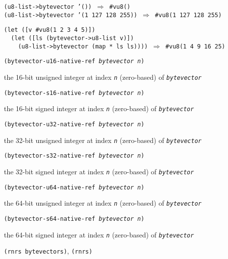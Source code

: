 \begin{alltt}
(u8-list-\textgreater{}bytevector '()) \(\Rightarrow\) \#{}vu8()
(u8-list-\textgreater{}bytevector '(1 127 128 255)) \(\Rightarrow\) \#{}vu8(1 127 128 255)

(let ([v \#{}vu8(1 2 3 4 5)])
  (let ([ls (bytevector-\textgreater{}u8-list v)])
    (u8-list-\textgreater{}bytevector (map * ls ls)))) \(\Rightarrow\) \#{}vu8(1 4 9 16 25)
\end{alltt}

\begin{description}

\label{objects_s254}\item[procedure] \texttt{(bytevector-u16-native-ref \textit{bytevector} \textit{n})}



\item[returns] the 16-bit unsigned integer at index \texttt{\textit{n}} (zero-based) of \texttt{\textit{bytevector}} 


\item[procedure] \texttt{(bytevector-s16-native-ref \textit{bytevector} \textit{n})}



\item[returns] the 16-bit signed integer at index \texttt{\textit{n}} (zero-based) of \texttt{\textit{bytevector}} 


\item[procedure] \texttt{(bytevector-u32-native-ref \textit{bytevector} \textit{n})}



\item[returns] the 32-bit unsigned integer at index \texttt{\textit{n}} (zero-based) of \texttt{\textit{bytevector}} 


\item[procedure] \texttt{(bytevector-s32-native-ref \textit{bytevector} \textit{n})}



\item[returns] the 32-bit signed integer at index \texttt{\textit{n}} (zero-based) of \texttt{\textit{bytevector}} 


\item[procedure] \texttt{(bytevector-u64-native-ref \textit{bytevector} \textit{n})}



\item[returns] the 64-bit unsigned integer at index \texttt{\textit{n}} (zero-based) of \texttt{\textit{bytevector}} 


\item[procedure] \texttt{(bytevector-s64-native-ref \textit{bytevector} \textit{n})}



\item[returns] the 64-bit signed integer at index \texttt{\textit{n}} (zero-based) of \texttt{\textit{bytevector}} 


\item[libraries] \texttt{(rnrs bytevectors)}, \texttt{(rnrs)}
\end{description}

